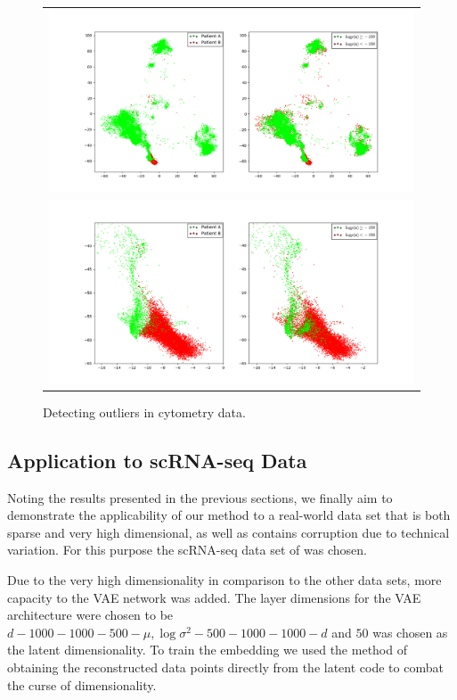 \begin{figure}[!htb]
  \centering
  \begin{tabular}{c}
    \includegraphics[width=\textwidth]{images/scored.png} \\
    \includegraphics[width=\textwidth]{images/scored_zoomed.png}
  \end{tabular}
  \caption{Detecting outliers in cytometry data.}
  \label{fig:cytometry_outliers}
\end{figure}

\subsection{Application to scRNA-seq Data}
\label{section:application_to_scrna}

Noting the results presented in the previous sections, we finally aim to demonstrate the applicability of our method to a real-world data set that is both sparse and very high dimensional, as well as contains corruption due to technical variation. For this purpose the scRNA-seq data set of \cite{tirosh} was chosen.

Due to the very high dimensionality in comparison to the other data sets, more capacity to the VAE network was added. The layer dimensions for the VAE architecture were chosen to be $d - 1000 - 1000 - 500 - \mu, \log \sigma^2 - 500 - 1000 - 1000 - d$ and $50$ was chosen as the latent dimensionality. To train the embedding we used the method of obtaining the reconstructed data points directly from the latent code to combat the curse of dimensionality.

